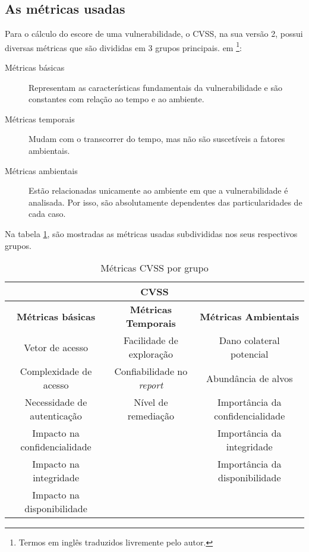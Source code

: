 		\subsection{As métricas usadas}
		\label{subsec:metricas_cvss}
			Para o cálculo do escore de uma vulnerabilidade, o CVSS, na sua versão 2, possui diversas métricas
			que são divididas em 3 grupos principais. 
			em \cite{Mell2007}\footnote{Termos em inglês traduzidos livremente pelo autor.}:
			\begin{description}
				\item[Métricas básicas]{Representam as características fundamentais da vulnerabilidade
				e são constantes com relação ao tempo e ao ambiente.}
				\item[Métricas temporais]{Mudam com o transcorrer do tempo, mas não são suscetíveis
				a fatores ambientais.}
				\item[Métricas ambientais]{Estão relacionadas unicamente ao ambiente em que a vulnerabilidade
				é analisada. Por isso, são absolutamente dependentes das particularidades de cada caso.}
			\end{description}	
			Na tabela \ref{tab:grupos_cvss}, são mostradas as métricas usadas subdivididas nos seus respectivos
			grupos. 

			\begin{table}
				\begin{tabular}{|c|c|c|}
					\hline
					\multicolumn{3}{|c|}{ \textbf{CVSS} } \\
					\hline
					\textbf{Métricas básicas} & \textbf{Métricas Temporais} & \textbf{Métricas Ambientais} \\
					\hline
					Vetor de acesso & Facilidade de exploração & Dano colateral potencial \\
					Complexidade de acesso & Confiabilidade no \textsl{report} & Abundância de alvos\\
					Necessidade de autenticação & Nível de remediação & Importância da confidencialidade \\
					Impacto na confidencialidade & & Importância da integridade\\
					Impacto na integridade & & Importância da disponibilidade \\
					Impacto na disponibilidade & &  \\
					\hline
				\end{tabular}
				\caption{Métricas CVSS por grupo}\label{tab:grupos_cvss}
			\end{table}
			

